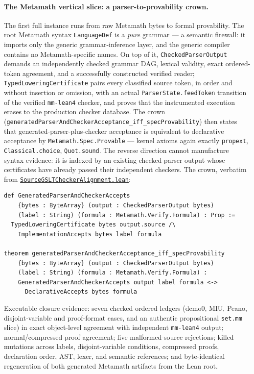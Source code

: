 \documentclass[11pt]{article}
\newcommand{\code}[1]{\texttt{#1}}
\begin{document}
\paragraph{The Metamath vertical slice: a parser-to-provability crown.}
The first full instance runs from raw Metamath bytes to formal
provability.  The root Metamath syntax \code{LanguageDef} is a \emph{pure} grammar
--- a semantic firewall: it imports only the generic grammar-inference
layer, and the generic compiler contains no Metamath-specific names.  On
top of it, \code{CheckedParserOutput} demands an independently checked
grammar DAG, lexical validity, exact ordered-token agreement, and a
successfully constructed verified reader; \code{TypedLoweringCertificate}
pairs every classified source token, in order and without insertion or
omission, with an actual \code{ParserState.feedToken} transition of the
verified \code{mm-lean4} checker, and proves that the instrumented
execution erases to the production checker database.  The crown
(\code{generatedParserAndCheckerAcceptance\_iff\_specProvability}) then
states that generated-parser-plus-checker acceptance is equivalent to
declarative acceptance by \code{Metamath.Spec.Provable} --- kernel axioms
again exactly \code{propext}, \code{Classical.choice}, \code{Quot.sound}.
The reverse direction cannot manufacture syntax evidence: it is indexed by
an existing checked parser output whose certificates have already passed
their independent checkers.  The crown, verbatim from
\href{https://github.com/zariuq/MeTTapedia/blob/main/lean/mettapedia/Mettapedia/Languages/Metamath/SourceGSLTCheckerAlignment.lean}{\code{SourceGSLTCheckerAlignment.lean}}:

\begin{lstlisting}
def GeneratedParserAndCheckerAccepts
    {bytes : ByteArray} (output : CheckedParserOutput bytes)
    (label : String) (formula : Metamath.Verify.Formula) : Prop :=
  TypedLoweringCertificate bytes output.source /\
    ImplementationAccepts bytes label formula

theorem generatedParserAndCheckerAcceptance_iff_specProvability
    {bytes : ByteArray} (output : CheckedParserOutput bytes)
    (label : String) (formula : Metamath.Verify.Formula) :
    GeneratedParserAndCheckerAccepts output label formula <->
      DeclarativeAccepts bytes formula
\end{lstlisting}

\noindent
Executable closure evidence: seven checked
ordered ledgers (demo0, MIU, Peano, disjoint-variable and proof-format
cases, and an authentic propositional \code{set.mm} slice) in exact
object-level agreement with independent \code{mm-lean4} output;
normal/compressed proof agreement; five malformed-source rejections;
killed mutations across labels, disjoint-variable conditions, compressed
proofs, declaration order, AST, lexer, and semantic references; and
byte-identical regeneration of both generated Metamath artifacts from the
Lean root.
\end{document}
